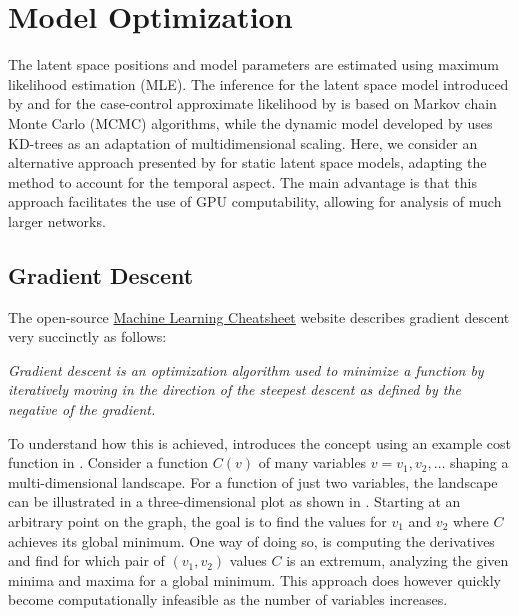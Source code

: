 \section{Model Optimization}\label{sec:model-opt}

The latent space positions and model parameters are estimated using maximum likelihood estimation (MLE). The inference for the latent space model introduced by \citeauthor*{hoff2002latent} and for the case-control approximate likelihood by \citeauthor*{raftery2012fast} is based on Markov chain Monte Carlo (MCMC) algorithms, while the dynamic model developed by \citeauthor{sarkar2005dynamic} uses KD-trees as an adaptation of multidimensional scaling. Here, we consider an alternative approach presented by \citeauthor{jacobsen2018a} for static latent space models, adapting the method to account for the temporal aspect. The main advantage is that this approach facilitates the use of GPU computability, allowing for analysis of much larger networks.

\subsection{Gradient Descent}

    The open-source \href{https://ml-cheatsheet.readthedocs.io/en/latest/index.html}{Machine Learning Cheatsheet} website describes gradient descent very succinctly as follows:
    \begin{displayquote}\itshape
        Gradient descent is an optimization algorithm used to minimize a function by iteratively moving in the direction of the steepest descent as defined by the negative of the gradient. 
    \end{displayquote}
    
    To understand how this is achieved, \citeauthor{nielsen2018neural} introduces the concept using an example cost function in \cite{nielsen2018neural}.
    Consider a function $C(v)$ of many variables $v = v_1, v_2, \dots$ shaping a multi-dimensional landscape. For a function of just two variables, the landscape can be illustrated in a three-dimensional plot as shown in . 
    Starting at an arbitrary point on the graph, the goal is to find the values for $v_1$ and $v_2$ where $C$ achieves its global minimum. One way of doing so, is computing the derivatives and find for which pair of $(v_1,v_2)$ values $C$ is an extremum, analyzing the given minima and maxima for a global minimum. This approach does however quickly become computationally infeasible as the number of variables increases. 
    
